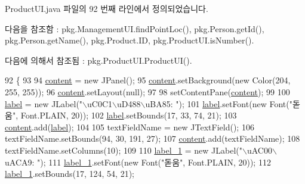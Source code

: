 Product\+U\+I.\+java 파일의 92 번째 라인에서 정의되었습니다.



다음을 참조함 \+:  pkg.\+Management\+U\+I.\+find\+Point\+Loc(), pkg.\+Person.\+get\+Id(), pkg.\+Person.\+get\+Name(), pkg.\+Product.\+ID, pkg.\+Product\+U\+I.\+is\+Number().



다음에 의해서 참조됨 \+:  pkg.\+Product\+U\+I.\+Product\+U\+I().


\begin{DoxyCode}
92                              \{
93         
94         \hyperlink{classpkg_1_1_product_u_i_a4b906446ebd18ba32a11ace86f26fe12}{content} = \textcolor{keyword}{new} JPanel();
95         \hyperlink{classpkg_1_1_product_u_i_a4b906446ebd18ba32a11ace86f26fe12}{content}.setBackground(\textcolor{keyword}{new} Color(204, 255, 255));
96         \hyperlink{classpkg_1_1_product_u_i_a4b906446ebd18ba32a11ace86f26fe12}{content}.setLayout(null);
97         
98         setContentPane(\hyperlink{classpkg_1_1_product_u_i_a4b906446ebd18ba32a11ace86f26fe12}{content});
99         
100         \hyperlink{classpkg_1_1_product_u_i_a0ef17a87fd778365f5e24e38081a1ea8}{label} = \textcolor{keyword}{new} JLabel(\textcolor{stringliteral}{"\(\backslash\)uC0C1\(\backslash\)uD488\(\backslash\)uBA85: "});
101         \hyperlink{classpkg_1_1_product_u_i_a0ef17a87fd778365f5e24e38081a1ea8}{label}.setFont(\textcolor{keyword}{new} Font(\textcolor{stringliteral}{"돋움"}, Font.PLAIN, 20));
102         \hyperlink{classpkg_1_1_product_u_i_a0ef17a87fd778365f5e24e38081a1ea8}{label}.setBounds(17, 33, 74, 21);
103         \hyperlink{classpkg_1_1_product_u_i_a4b906446ebd18ba32a11ace86f26fe12}{content}.add(\hyperlink{classpkg_1_1_product_u_i_a0ef17a87fd778365f5e24e38081a1ea8}{label});
104         
105         textFieldName = \textcolor{keyword}{new} JTextField();
106         textFieldName.setBounds(94, 30, 191, 27);
107         \hyperlink{classpkg_1_1_product_u_i_a4b906446ebd18ba32a11ace86f26fe12}{content}.add(textFieldName);
108         textFieldName.setColumns(10);
109         
110         \hyperlink{classpkg_1_1_product_u_i_a77b14da002223a885455d165ca197069}{label\_1} = \textcolor{keyword}{new} JLabel(\textcolor{stringliteral}{"\(\backslash\)uAC00\(\backslash\)uACA9: "});
111         \hyperlink{classpkg_1_1_product_u_i_a77b14da002223a885455d165ca197069}{label\_1}.setFont(\textcolor{keyword}{new} Font(\textcolor{stringliteral}{"돋움"}, Font.PLAIN, 20));
112         \hyperlink{classpkg_1_1_product_u_i_a77b14da002223a885455d165ca197069}{label\_1}.setBounds(17, 124, 54, 21);

\end{DoxyCode}
